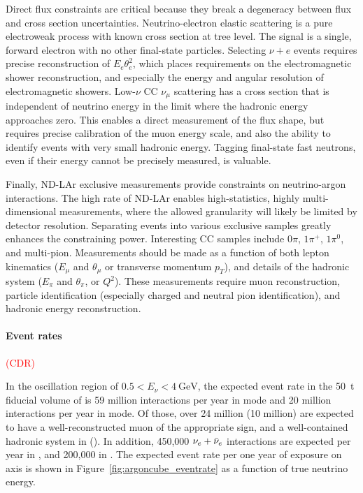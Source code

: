 Direct flux constraints are critical because they break a degeneracy between flux and cross section uncertainties. Neutrino-electron elastic scattering is a pure electroweak process with known cross section at tree level. The signal is a single, forward electron with no other final-state particles. Selecting $\nu+e$ events requires precise reconstruction of $E_{e}\theta_{e}^{2}$, which places requirements on the electromagnetic shower reconstruction, and especially the energy and angular resolution of electromagnetic showers. Low-$\nu$ CC $\nu_{\mu}$ scattering has a cross section that is independent of neutrino energy in the limit where the hadronic energy approaches zero. This enables a direct measurement of the flux shape, but requires precise calibration of the muon energy scale, and also the ability to identify events with very small hadronic energy. Tagging final-state fast neutrons, even if their energy cannot be precisely measured, is valuable.

Finally, ND-LAr exclusive measurements provide constraints on neutrino-argon interactions. The high rate of ND-LAr enables high-statistics, highly multi-dimensional measurements, where the allowed granularity will likely be limited by detector resolution. Separating events into various exclusive samples greatly enhances the constraining power. Interesting CC samples include $0\pi$, $1\pi^{+}$, $1\pi^{0}$, and multi-pion. Measurements should be made as a function of both lepton kinematics ($E_{\mu}$ and $\theta_{\mu}$ or transverse momentum $p_{T}$), and details of the hadronic system ($E_{\pi}$ and $\theta_{\pi}$, or $Q^{2}$). These measurements require muon reconstruction, particle identification 
(especially charged and neutral pion identification), and hadronic energy reconstruction.

\paragraph{Event rates} \textcolor{red}{(CDR)}

In the oscillation region of $\SI{0.5} < E_\nu < \SI{4}{\giga\electronvolt}$, the expected event rate in the \SI{50}{\tonne} fiducial volume of  is 59 million \numu {} interactions per year in  mode and 20 million \anumu {} interactions per year in  mode. Of those, over 24 million (10 million) are expected to have a well-reconstructed muon of the appropriate sign, and a well-contained hadronic system in  (). In addition, 450,000 $\nu_e+\bar\nu_e$  interactions are expected per year in , and 200,000 in . The expected event rate per one year of exposure on axis is shown in Figure~\ref{fig:argoncube_eventrate} as a function of true neutrino energy.

